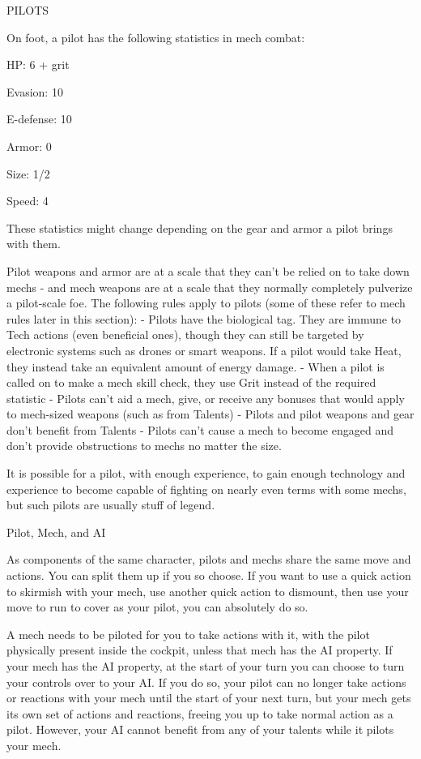                                                      PILOTS

On foot, a pilot has the following statistics in mech combat:

	        HP: 6 + grit

	        Evasion: 10

         E-defense: 10

	        Armor: 0

	        Size: 1/2

	        Speed: 4


These statistics might change depending on the gear and armor a pilot brings with them.


Pilot weapons and armor are at a scale that they can’t be relied on to take down mechs - and
mech weapons are at a scale that they normally completely pulverize a pilot-scale foe. The
following rules apply to pilots (some of these refer to mech rules later in this section):
     -   Pilots have the biological tag. They are immune to Tech actions (even beneficial ones),
         though they can still be targeted by electronic systems such as drones or smart weapons.
         If a pilot would take Heat, they instead take an equivalent amount of energy damage.
     -   When a pilot is called on to make a mech skill check, they use Grit instead of the required
         statistic
     -   Pilots can’t aid a mech, give, or receive any bonuses that would apply to mech-sized
         weapons (such as from Talents)
     -   Pilots and pilot weapons and gear don’t benefit from Talents
     -   Pilots can’t cause a mech to become engaged and don’t provide obstructions to mechs no
         matter the size.

It is possible for a pilot, with enough experience, to gain enough technology and experience to
become capable of fighting on nearly even terms with some mechs, but such pilots are usually
stuff of legend.

                                                Pilot, Mech, and AI

As components of the same character, pilots and mechs share the same move and actions. You
can split them up if you so choose. If you want to use a quick action to skirmish with your mech,
use another quick action to dismount, then use your move to run to cover as your pilot, you can
absolutely do so.

A mech needs to be piloted for you to take actions with it, with the pilot physically present inside
the cockpit, unless that mech has the AI property. If your mech has the AI property, at the start of
your turn you can choose to turn your controls over to your AI. If you do so, your pilot can no
longer take actions or reactions with your mech until the start of your next turn, but your mech
gets its own set of actions and reactions, freeing you up to take normal action as a pilot. However,
your AI cannot benefit from any of your talents while it pilots your mech.